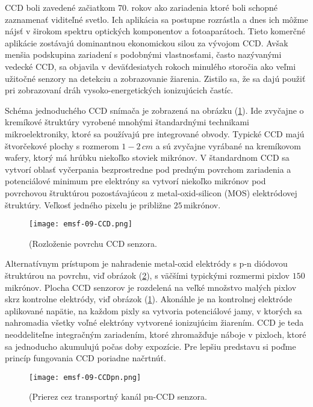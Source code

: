 \documentclass[../../main.tex]{subfiles}
\begin{document}
CCD boli zavedené začiatkom 70. rokov ako zariadenia ktoré boli schopné zaznamenať viditeľné svetlo. Ich aplikácia sa postupne rozrástla a dnes ich môžme nájsť v širokom spektru optických komponentov a fotoaparátoch. Tieto komerčné aplikácie zostávajú dominantnou ekonomickou silou za vývojom CCD. Avšak menšia podskupina zariadení s podobnými vlastnosťami, často nazývanými vedecké CCD, sa objavila v deväťdesiatych rokoch minulého storočia ako veľmi užitočné senzory na detekciu a zobrazovanie žiarenia. Zistilo sa, že sa dajú použiť pri zobrazovaní dráh vysoko-energetických ionizujúcich častíc.

Schéma jednoduchého CCD snímača je zobrazená na obrázku (\ref{em9:fig:CCD}). Ide zvyčajne o kremíkové štruktúry vyrobené mnohými štandardnými technikami mikroelektroniky, ktoré sa používajú pre integrované obvody. Typické CCD majú štvorčekové plochy s rozmerom $1-2\,\unit{cm}$ a sú zvyčajne vyrábané na kremíkovom wafery, ktorý má hrúbku niekoľko stoviek mikrónov. V štandardnom CCD sa vytvorí oblasť vyčerpania bezprostredne pod predným povrchom zariadenia a potenciálové minimum pre elektróny sa vytvorí niekoľko mikrónov pod povrchovou štruktúrou pozostávajúcou z metal-oxid-silicon (MOS) elektródovej štruktúry. Veľkosť jedného pixelu je približne $25\,$mikrónov. 

\begin{figure}[!h]
\texttt{[image: emsf-09-CCD.png]}
\centering
\caption{(Rozloženie povrchu CCD senzora.}
\label{em9:fig:CCD}
\end{figure}

Alternatívnym prístupom je nahradenie metal-oxid elektródy s p-n diódovou štruktúrou na povrchu, viď obrázok (\ref{em9:fig:CCDpn}), s väčšími typickými rozmermi pixlov $150\,$ mikrónov. Plocha CCD senzorov je rozdelená na veľké množstvo malých pixlov skrz kontrolne elektródy, viď obrázok (\ref{em9:fig:CCD}). Akonáhle je na kontrolnej elektróde aplikované napätie, na každom pixly sa vytvoria potenciálové jamy, v ktorých sa nahromadia všetky voľné elektróny vytvorené ionizujúcim žiarením. CCD je teda neoddeliteľne integračným zariadením, ktoré zhromažďuje náboje v pixloch, ktoré sa jednoducho akumulujú počas doby expozície. Pre lepšiu predstavu si poďme princíp fungovania CCD poriadne načrtnúť.

\begin{figure}[!h]
\texttt{[image: emsf-09-CCDpn.png]}
\centering
\caption{(Prierez cez transportný kanál pn-CCD senzora.}
\label{em9:fig:CCDpn}
\end{figure}
\end{document}
